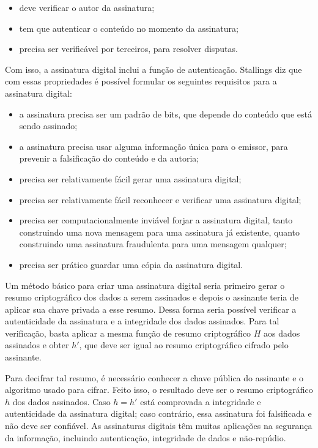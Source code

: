 \documentclass{article}
\begin{document}
\begin{itemize}
  \item deve verificar o autor da assinatura;

  \item tem que autenticar o conteúdo no momento da assinatura;

  \item precisa ser verificável por terceiros, para resolver disputas.
\end{itemize}

Com isso, a assinatura digital inclui a função de autenticação. Stallings diz
que com essas propriedades é possível formular os seguintes requisitos para
a assinatura digital:

\begin{itemize}
  \item a assinatura precisa ser um padrão de bits, que depende do conteúdo que
      está sendo assinado;

  \item a assinatura precisa usar alguma informação única para o emissor, para
      prevenir a falsificação do conteúdo e da autoria;

  \item precisa ser relativamente fácil gerar uma assinatura digital;

  \item precisa ser relativamente fácil reconhecer e verificar uma assinatura
      digital;

  \item precisa ser computacionalmente inviável forjar a assinatura digital,
      tanto construindo uma nova mensagem para uma assinatura já existente,
        quanto construindo uma assinatura fraudulenta para uma mensagem
        qualquer;

  \item precisa ser prático guardar uma cópia da assinatura digital.
\end{itemize}

Um método básico para criar uma assinatura digital seria primeiro gerar
o resumo criptográfico dos dados a serem assinados e depois o assinante teria
de aplicar sua chave privada a esse resumo. Dessa forma seria possível
verificar a autenticidade da assinatura e a integridade dos dados
assinados. Para tal verificação, basta aplicar a mesma função de resumo
criptográfico $H$ aos dados assinados e obter $h'$, que deve ser igual ao
resumo criptográfico cifrado pelo assinante.

Para decifrar tal resumo, é necessário conhecer a chave pública do assinante
e o algoritmo usado para cifrar. Feito isso, o resultado deve ser o resumo
criptográfico $h$ dos dados assinados. Caso $h = h'$ está comprovada
a integridade e autenticidade da assinatura digital; caso contrário, essa
assinatura foi falsificada e não deve ser confiável. As assinaturas digitais
têm muitas aplicações na segurança da informação, incluindo autenticação,
integridade de dados e não-repúdio.
\end{document}
